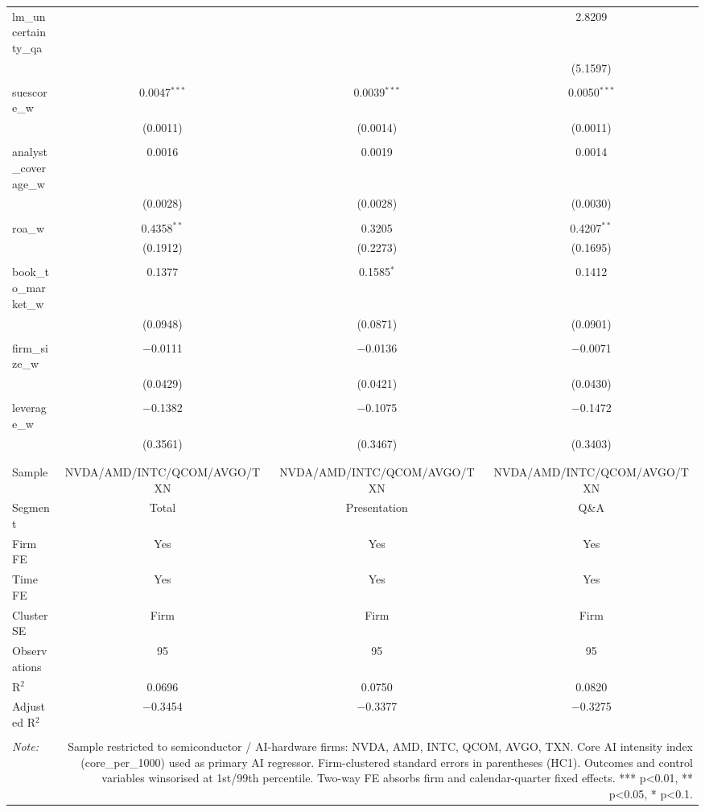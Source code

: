 \begin{table}[!htbp]
\begin{tabular}{@{\extracolsep{5pt}}lccc}
 lm\_uncertainty\_qa &  &  & 2.8209 \\ 
  &  &  & (5.1597) \\ 
  & & & \\ 
 suescore\_w & 0.0047$^{***}$ & 0.0039$^{***}$ & 0.0050$^{***}$ \\ 
  & (0.0011) & (0.0014) & (0.0011) \\ 
  & & & \\ 
 analyst\_coverage\_w & 0.0016 & 0.0019 & 0.0014 \\ 
  & (0.0028) & (0.0028) & (0.0030) \\ 
  & & & \\ 
 roa\_w & 0.4358$^{**}$ & 0.3205 & 0.4207$^{**}$ \\ 
  & (0.1912) & (0.2273) & (0.1695) \\ 
  & & & \\ 
 book\_to\_market\_w & 0.1377 & 0.1585$^{*}$ & 0.1412 \\ 
  & (0.0948) & (0.0871) & (0.0901) \\ 
  & & & \\ 
 firm\_size\_w & $-$0.0111 & $-$0.0136 & $-$0.0071 \\ 
  & (0.0429) & (0.0421) & (0.0430) \\ 
  & & & \\ 
 leverage\_w & $-$0.1382 & $-$0.1075 & $-$0.1472 \\ 
  & (0.3561) & (0.3467) & (0.3403) \\ 
  & & & \\ 
\hline \\[-1.8ex] 
Sample & NVDA/AMD/INTC/QCOM/AVGO/TXN & NVDA/AMD/INTC/QCOM/AVGO/TXN & NVDA/AMD/INTC/QCOM/AVGO/TXN \\ 
Segment & Total & Presentation & Q\&A \\ 
Firm FE & Yes & Yes & Yes \\ 
Time FE & Yes & Yes & Yes \\ 
Cluster SE & Firm & Firm & Firm \\ 
Observations & 95 & 95 & 95 \\ 
R$^{2}$ & 0.0696 & 0.0750 & 0.0820 \\ 
Adjusted R$^{2}$ & $-$0.3454 & $-$0.3377 & $-$0.3275 \\ 
\hline 
\hline \\[-1.8ex] 
\textit{Note:}  & \multicolumn{3}{r}{Sample restricted to semiconductor / AI-hardware firms: NVDA, AMD, INTC, QCOM, AVGO, TXN. Core AI intensity index (core_per_1000) used as primary AI regressor. Firm-clustered standard errors in parentheses (HC1). Outcomes and control variables winsorised at 1st/99th percentile. Two-way FE absorbs firm and calendar-quarter fixed effects. *** p<0.01, ** p<0.05, * p<0.1.} \\ 
\end{tabular} 
\end{table} 
